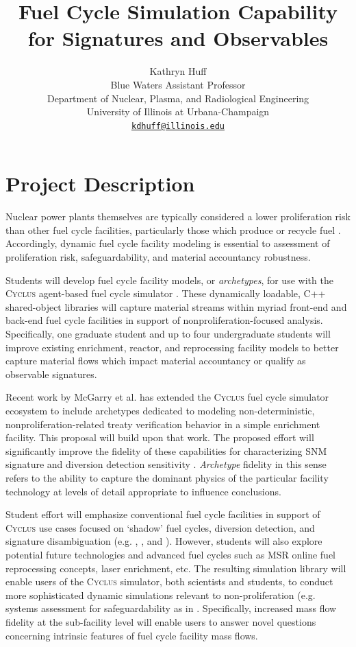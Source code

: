 \documentclass[11pt,letterpaper]{article}
\date{}
\author{Kathryn Huff\\
        Blue Waters Assistant Professor\\
        Department of Nuclear, Plasma, and Radiological Engineering\\
        University of Illinois at Urbana-Champaign\\
         \href{mailto:kdhuff@illinois.edu}{\texttt{kdhuff@illinois.edu}}}
\title{\vspace{-1in}Fuel Cycle Simulation Capability for Signatures and Observables}
\newcommand{\Cyclus}{\textsc{Cyclus}\xspace}%
\begin{document}
\maketitle
\section{Project Description}

Nuclear power plants themselves are typically considered a lower proliferation 
risk than other fuel cycle facilities, particularly those which produce or 
recycle fuel 
\cite{national_academy_of_sciences_americas_2009,national_research_council_proliferation_2012}. Accordingly, dynamic fuel cycle 
facility modeling is essential to assessment of proliferation risk, 
safeguardability, and material accountancy robustness. 

Students will develop fuel cycle facility models, or \emph{archetypes}, for use 
with the \Cyclus agent-based fuel cycle simulator \cite{huff_fundamental_2016}. 
These dynamically loadable, C++ shared-object libraries will capture material 
streams within myriad front-end and back-end fuel cycle facilities in support 
of nonproliferation-focused analysis.  Specifically, one graduate student and up 
to four undergraduate students will improve existing enrichment, reactor, and 
reprocessing facility models to better capture material flows which impact 
material accountancy or qualify as observable signatures.  

Recent work by McGarry et al. \cite{mcgarry_mbmore_2017} has extended the 
\Cyclus fuel cycle simulator \cite{huff_fundamental_2016} ecosystem to include 
archetypes dedicated to modeling non-deterministic, nonproliferation-related 
treaty verification behavior in a simple enrichment facility. This proposal 
will build upon that work.  The proposed effort will significantly improve the 
fidelity of these capabilities for characterizing \gls{SNM} signature and 
diversion detection sensitivity \cite{mcgarry_mbmore_2017}.  \emph{Archetype} 
fidelity in this sense refers to the ability to capture the dominant physics of 
the particular facility technology at levels of detail appropriate to influence 
conclusions.

Student effort will emphasize conventional fuel cycle facilities in support of 
\Cyclus use cases focused on `shadow' fuel cycles, diversion detection, and 
signature disambiguation (e.g.
\cite{boyer_developing_2014}, \cite{hou_diversion_2016} 
\cite{rossi_application_2015}, and \cite{yilmaz_online_2016}).  However, students will also explore potential future technologies and advanced fuel cycles such as \gls{MSR} online fuel reprocessing concepts, laser enrichment, etc.  The resulting simulation library will enable users of the \Cyclus simulator, both scientists and students, to conduct more sophisticated dynamic simulations relevant to non-proliferation (e.g.  systems assessment for safeguardability as in \cite{borrelli_approaches_2017}.  Specifically, increased mass flow fidelity at the sub-facility level will enable users to answer novel questions concerning intrinsic features of fuel cycle facility mass flows.
\end{document}
